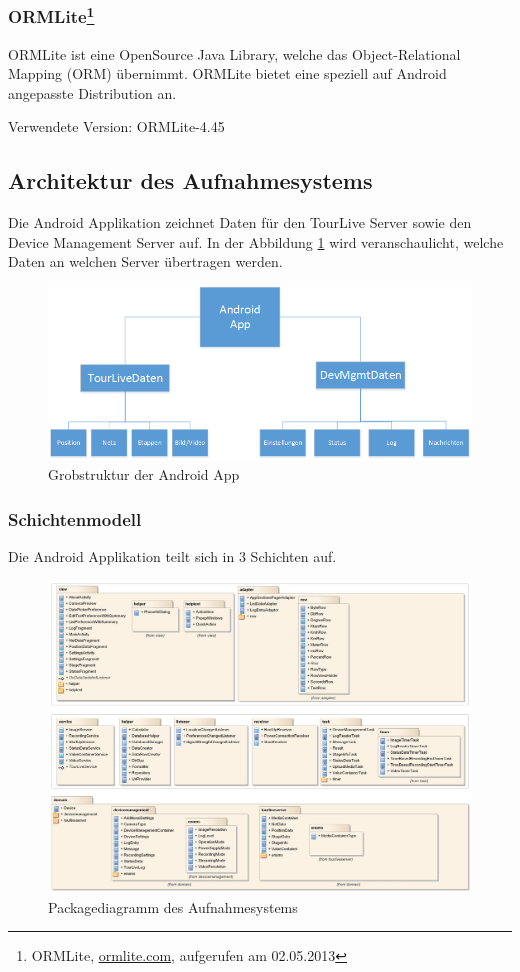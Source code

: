 \subsubsection{ORMLite\footnote{ORMLite, \url{ormlite.com}, aufgerufen am 02.05.2013}} ORMLite ist eine OpenSource Java Library, welche das Object-Relational Mapping (ORM) übernimmt. ORMLite bietet eine speziell auf Android angepasste Distribution an. 

Verwendete Version: ORMLite-4.45

\subsection{Architektur des Aufnahmesystems}
Die Android Applikation zeichnet Daten für den TourLive Server sowie den Device Management Server auf. In der Abbildung \ref{fig:grobstrukturandroid}
 wird veranschaulicht, welche Daten an welchen Server übertragen werden.

\begin{figure}[H]
	\centering
	\includegraphics[width=120mm]{images/android/uebersicht.png}
	\caption{Grobstruktur der Android App}
	\label{fig:grobstrukturandroid} 
\end{figure}

\subsubsection{Schichtenmodell}
Die Android Applikation teilt sich in 3 Schichten auf.

\begin{figure}[H]
	\centering
	\includegraphics[width=150mm]{images/android/schichten.jpg}
	\caption{Packagediagramm des Aufnahmesystems}
\end{figure}

